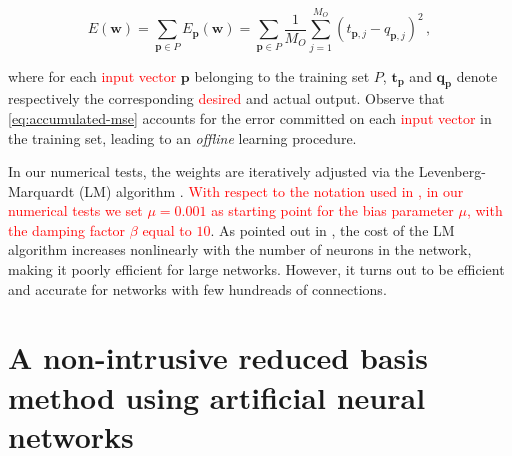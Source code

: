 \documentclass[longtitle]{elsarticle}
\numberwithin{equation}{section}
\theoremstyle{theorem}
\theoremstyle{definition}
\theoremstyle{remark}
\theoremstyle{proposition}
\numberwithin{figure}{section}
\begin{document}
		\begin{linenomath}\begin{linenomath}\begin{equation}
			\label{eq:accumulated-mse}
			E(\mathbf{w}) = \sum_{\mathbf{p} \in P} E_{\mathbf{p}}(\mathbf{w}) = \sum_{\mathbf{p} \in P} \dfrac{1}{M_O} \sum_{j = 1}^{M_O} \left( t_{\mathbf{p},j} - q_{\mathbf{p},j} \right)^2 \, ,
		\end{equation}\end{linenomath}\end{linenomath}
		where for each \textcolor{red}{input vector} $\mathbf{p}$ belonging to the training set $P$, $\mathbf{t}_{\mathbf{p}}$ and $\mathbf{q}_{\mathbf{p}}$ denote respectively the corresponding \textcolor{red}{desired} and actual output. Observe that \eqref{eq:accumulated-mse} accounts for the error committed on each \textcolor{red}{input vector} in the training set, leading to an \emph{offline} learning procedure.
		
		In our numerical tests, the weights are iteratively adjusted via the Levenberg-Marquardt (\textcolor{deepgreen}{LM}) algorithm \cite{Lev44, Mar63}. \textcolor{red}{With respect to the notation used in \cite{Hag94}, in our numerical tests we set $\mu = 0.001$ as starting point for the bias parameter $\mu$, with the damping factor $\beta$ equal to $10$}. As pointed out in \cite{Hag96}, the cost of the \textcolor{deepgreen}{LM} algorithm increases nonlinearly with the number of neurons in the network, making it poorly efficient for large networks. However, it turns out to be efficient and accurate for networks with few hundreads of connections.  		

	
	\section{A non-intrusive reduced basis method using artificial neural networks}
	\label{section:A non-intrusive RB method using neural networks}
							
\end{document}

